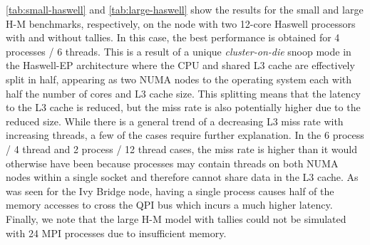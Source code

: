 \documentclass{mc2015}
\begin{document}
\autoref{tab:small-haswell} and \autoref{tab:large-haswell} show the results
for the small and large H-M benchmarks, respectively, on the node with two
12-core Haswell processors with and without tallies. In this case, the best
performance is obtained for 4 processes / 6 threads. This is a result of a
unique {\em cluster-on-die} snoop mode in the Haswell-EP architecture
where the CPU and shared L3 cache are effectively split in half, appearing as
two NUMA nodes to the operating system each with
half the number of cores and L3 cache size. This splitting means that the latency to
the L3 cache is reduced, but the miss rate is also potentially higher due to
the reduced size. While there is a general trend of a decreasing
L3 miss rate with increasing threads, a few of the cases require further
explanation. In the 6 process / 4 thread and 2 process / 12 thread cases, the
miss rate is higher than it would otherwise have been because processes may
contain threads on both NUMA nodes within a single socket and therefore cannot
share data in the L3 cache. As was seen for the Ivy Bridge node, having a
single process causes half of the memory accesses to cross the QPI bus which
incurs a much higher latency. Finally, we note that the large H-M model with
tallies could not be simulated with 24 MPI processes due to insufficient
memory.
\end{document}
